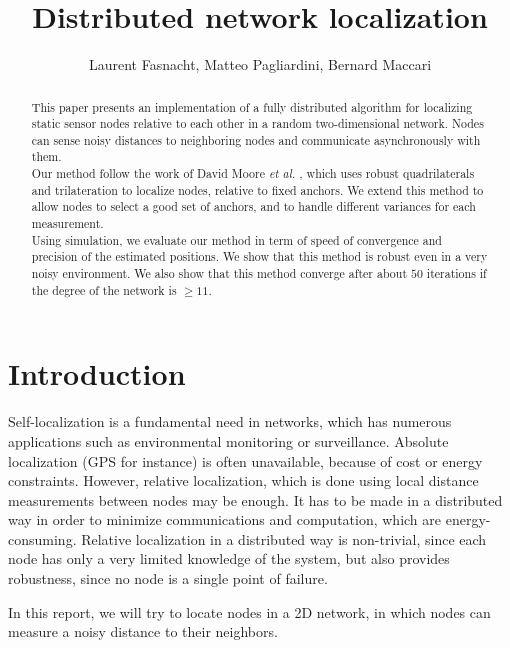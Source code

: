 \documentclass[letterpaper, 10 pt, conference]{ieeeconf}  %
\title{\LARGE \bf
 Distributed network localization
}
\author{Laurent Fasnacht, Matteo Pagliardini, Bernard Maccari%
}
\begin{document}
\maketitle
\thispagestyle{empty}
\pagestyle{empty}


\begin{abstract}
This paper presents an implementation of a fully distributed algorithm for localizing static sensor nodes relative to each other in a random two-dimensional network. Nodes can sense noisy distances to neighboring nodes and communicate asynchronously with them. \\
Our method follow the work of David Moore \emph{et al.} \cite{MooreTeller}, which uses robust quadrilaterals and trilateration to localize nodes, relative to fixed anchors. We extend this method to allow nodes to select a good set of anchors, and to handle different variances for each measurement. \\
Using simulation, we evaluate our method in term of speed of convergence and precision of the estimated positions. We show that this method is robust even in a very noisy environment. We also show that this method converge after about $50$ iterations if the degree of the network is $\geq 11$. \\
\end{abstract}


\section{Introduction}

Self-localization is a fundamental need in networks, which has numerous applications such as environmental monitoring or surveillance. Absolute localization (GPS for instance) is often unavailable, because of cost or energy constraints. However, relative localization, which is done using local distance measurements between nodes may be enough. It has to be made in a distributed way in order to minimize communications and computation, which are energy-consuming. Relative localization in a distributed way is non-trivial, since each node has only a very limited knowledge of the system, but also provides robustness, since no node is a single point of failure.

In this report, we will try to locate nodes in a 2D network, in which nodes can measure a noisy distance to their neighbors.
\end{document}
